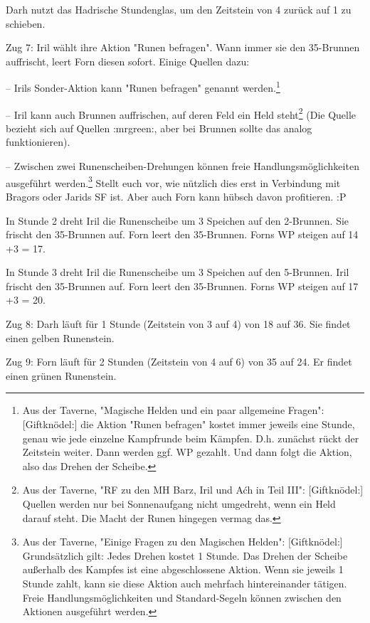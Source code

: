 \documentclass[10pt, a4paper, oneside]{book}
\begin{document}
{Darh nutzt das Hadrische Stundenglas, um den Zeitstein von 4 zurück auf 1 zu schieben.



Zug 7: Iril wählt ihre Aktion "Runen befragen". Wann immer sie den 35-Brunnen auffrischt, leert Forn diesen sofort. Einige Quellen dazu:

– Irils Sonder-Aktion kann "Runen befragen" genannt werden.\footnote{Aus der Taverne, "Magische Helden und ein paar allgemeine Fragen": [Giftknödel:] die Aktion "Runen befragen" kostet immer jeweils eine Stunde, genau wie jede einzelne Kampfrunde beim Kämpfen. D.h. zunächst rückt der Zeitstein weiter. Dann werden ggf. WP gezahlt. Und dann folgt die Aktion, also das Drehen der Scheibe.}

– Iril kann auch Brunnen auffrischen, auf deren Feld ein Held steht\footnote{Aus der Taverne, "RF zu den MH Barz, Iril und Aćh in Teil III": [Giftknödel:] Quellen werden nur bei Sonnenaufgang nicht umgedreht, wenn ein Held darauf steht. Die Macht der Runen hingegen vermag das.} (Die Quelle bezieht sich auf Quellen :mrgreen:, aber bei Brunnen sollte das analog funktionieren).

– Zwischen zwei Runenscheiben-Drehungen können freie Handlungsmöglichkeiten ausgeführt werden.\footnote{Aus der Taverne, "Einige Fragen zu den Magischen Helden": [Giftknödel:] Grundsätzlich gilt: Jedes Drehen kostet 1 Stunde. Das Drehen der Scheibe außerhalb des Kampfes ist eine abgeschlossene Aktion. Wenn sie jeweils 1 Stunde zahlt, kann sie diese Aktion auch mehrfach hintereinander tätigen.
Freie Handlungsmöglichkeiten und Standard-Segeln können zwischen den Aktionen ausgeführt werden.} Stellt euch vor, wie nützlich dies erst in Verbindung mit Bragors oder Jarids SF ist. Aber auch Forn kann hübsch davon profitieren. :P

In Stunde 2 dreht Iril die Runenscheibe um 3 Speichen auf den 2-Brunnen. Sie frischt den 35-Brunnen auf. Forn leert den 35-Brunnen. Forns WP steigen auf 14 +3 = 17.

In Stunde 3 dreht Iril die Runenscheibe um 3 Speichen auf den 5-Brunnen. Iril frischt den 35-Brunnen auf. Forn leert den 35-Brunnen. Forns WP steigen auf 17 +3 = 20.



Zug 8: Darh läuft für 1 Stunde (Zeitstein von 3 auf 4) von 18 auf 36. Sie findet einen gelben Runenstein.



Zug 9: Forn läuft für 2 Stunden (Zeitstein von 4 auf 6) von 35 auf 24. Er findet einen grünen Runenstein.

}
\end{document}
